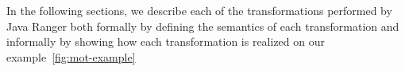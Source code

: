 In the following sections, we describe each of the transformations performed by Java Ranger both formally by defining the semantics of each transformation and informally by showing how each transformation is realized on our example~\ref{fig:mot-example}


%
%
%
%

